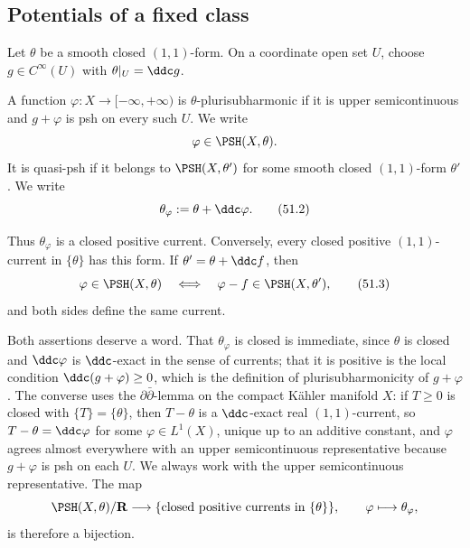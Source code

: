 \subsection{Potentials of a fixed class}
\label{sec:ch51-potentials}

Let $\theta$ be a smooth closed $(1,1)$-form.  On a coordinate open
set $U$, choose $g\in C^\infty(U)$ with $\theta|_U=\ddc g$.

\par\noindent\begin{minipage}{\textwidth}
\begin{definition}[Potentials]
\label{def:complex-theta-psh}
A function $\varphi:X\to[-\infty,+\infty)$ is
$\theta$-plurisubharmonic if it is upper semicontinuous and
$g+\varphi$ is psh on every such $U$.  We write
\[
                   \varphi\in\PSH(X,\theta).
\]
It is quasi-psh if it belongs to $\PSH(X,\theta')$ for some smooth
closed $(1,1)$-form $\theta'$.  We write
\[
       \theta_\varphi:=\theta+\ddc\varphi .
\tag{51.2}\label{eq:complex-current-potential}
\]
\end{definition}
\end{minipage}\par\medskip

Thus $\theta_\varphi$ is a closed positive current.  Conversely, every
closed positive $(1,1)$-current in $\{\theta\}$ has this form.
If $\theta'=\theta+\ddc f$, then
\[
 \varphi\in\PSH(X,\theta)
 \quad\Longleftrightarrow\quad
 \varphi-f\in\PSH(X,\theta'),
\tag{51.3}\label{eq:complex-change-representative}
\]
and both sides define the same current.

Both assertions deserve a word.  That $\theta_\varphi$ is closed is
immediate, since $\theta$ is closed and $\ddc\varphi$ is
$\ddc$-exact in the sense of currents; that it is positive is the local
condition $\ddc(g+\varphi)\geq0$, which is the definition of
plurisubharmonicity of $g+\varphi$.  The converse uses the
$\partial\bar\partial$-lemma on the compact K\"ahler manifold $X$: if
$T\geq0$ is closed with $\{T\}=\{\theta\}$, then $T-\theta$ is a
$\ddc$-exact real $(1,1)$-current, so $T-\theta=\ddc\varphi$ for some
$\varphi\in L^1(X)$, unique up to an additive constant, and
$\varphi$ agrees almost everywhere with an upper semicontinuous
representative because $g+\varphi$ is psh on each $U$.  We always work
with the upper semicontinuous representative.  The map
\[
 \PSH(X,\theta)/\mathbf R
 \longrightarrow
 \{\text{closed positive currents in }\{\theta\}\},
 \qquad
 \varphi\longmapsto\theta_\varphi ,
\]
is therefore a bijection.

